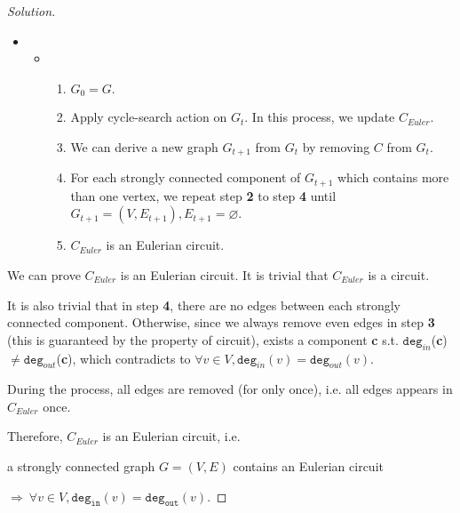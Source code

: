\documentclass{article}
\newenvironment{solution}{\begin{proof}[\noindent\it Solution]}{\end{proof}}
\begin{document}
\begin{solution}
    \vspace{-0.75em}
    \begin{itemize}
        \item[]\begin{itemize}
            \item[] \begin{enumerate}
            \item $G_0=G.$
            \item Apply cycle-search action on $G_t$. In this process, we update $C_{Euler}.$
            \item We can derive a new graph $G_{t+1}$ from $G_t$ by removing $C$ from $G_t$. 
            \item For each strongly connected component of $G_{t+1}$ which contains more than one vertex, we repeat step \textbf{2} to step \textbf{4} until $G_{t+1}=(V,E_{t+1}), E_{t+1}=\varnothing$.
            \item $C_{Euler}$ is an Eulerian circuit.
        \end{enumerate}
        \end{itemize} 
    \end{itemize}
    
    \vspace{-0.5em} \hspace{0.5em}
    We can prove $C_{Euler}$ is an Eulerian circuit. It is trivial that $C_{Euler}$ is a circuit.
    
    \hspace{0.7em}
    It is also trivial that in step \textbf{4}, there are no edges between each strongly connected component. Otherwise, since we always remove even edges in step \textbf{3} (this is guaranteed by the property of circuit), exists a component \textbf{c} s.t. $\mathtt{deg}_{in}$(\textbf{c})$\neq\mathtt{deg}_{out}$(\textbf{c}), which contradicts to $\forall v\in V, \mathtt{deg}_{in}(v)=\mathtt{deg}_{out}(v)$.
    
    \hspace{0.5em}
    During the process, all edges are removed (for only once), i.e. all edges appears in $C_{Euler}$ once.
    
    \hspace{0.5em}
    Therefore, $C_{Euler}$ is an Eulerian circuit, i.e.
     
    \hspace{5.5em}
    a strongly connected graph $G=(V,E)$ contains an Eulerian circuit 
    
    \hspace{5.5em}
    $\Longrightarrow\ \forall v\in V, \mathtt{deg_{in}}(v)=\mathtt{deg_{out}}(v).$
    

\end{solution}
\end{document}
